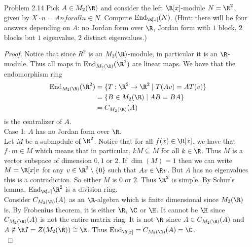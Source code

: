 \documentclass[a4paper]{article}
\begin{document}
\begin{ex}{Problem 2.14}{} Pick $A\in M_2(\R)$ and consider the left $\R[x]$-module $N=\R^2$, given by $X\cdot n=An for all n\in N$. Compute $\text{End}_{\R[x]}(N)$. (Hint: there will be four answers depending on $A$: no Jordan form over $\R$, Jordan form with $1$ block, $2$ blocks but $1$ eigenvalue, $2$ distinct eigenvalues.) 
\begin{proof}
Notice that since $R^2$ is an $M_2(\R)$-module, in particular it is an $\R$-module. Thus all maps in $\text{End}_{M_2(\R)}(\R^2)$ are linear maps. We have that the endomorphism ring
\begin{align*}
\text{End}_{M_2(\R)}(\R^2)&=\{T:\R^2\to\R^2\;|\;T(Av)=AT(v)\}\\
&=\{B\in M_2(\R)\;|\;AB=BA\}\\
&=C_{M_2(\R)}(A)
\end{align*}
is the centralizer of $A$. \\

Case 1: $A$ has no Jordan form over $\R$. \\
Let $M$ be a submodule of $\R^2$. Notice that for all $f(x)\in\R[x]$, we have that $f\cdot m\in M$ which means that in particular, $kM\subseteq M$ for all $k\in\R$. Thus $M$ is a vector subspace of dimension $0,1$ or $2$. If $\dim(M)=1$ then we can write $M=\R[x]v$ for any $v\in\R^2\setminus\{0\}$ such that $Av\in\R v$. But $A$ has no eigenvalues this is a contradiction. So either $M$ is $0$ or $2$. Thus $\R^2$ is simple. By Schur's lemma, $\text{End}_{\R[x]}\R^2$ is a division ring. \\

Consider $C_{M_2(\R)}(A)$ as an $\R$-algebra which is finite dimensional since $M_2(\R)$ is. By Frobenius theorem, it is either $\R$, $\C$ or $\H$. It cannot be $\H$ since $C_{M_2(\R)}(A)$ is not the entire matrix ring. It is not $\R$ since $A\in C_{M_2(\R)}(A)$ and $A\notin\R I=Z(M_2(\R))\cong\R$. Thus $\text{End}_{\R[x]}=C_{M_2(\R)}(A)=\C$. \\


\end{proof}
\end{ex}
\end{document}
